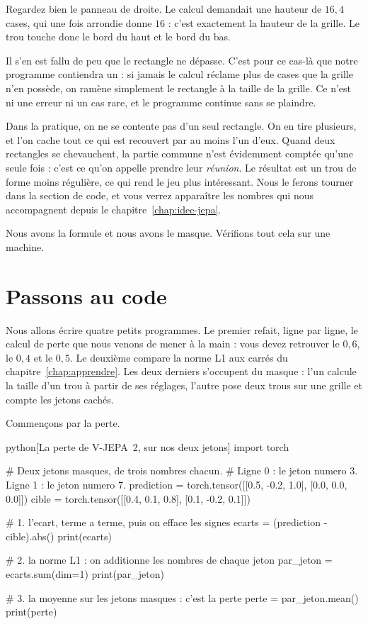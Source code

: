 \begin{surlesdonnees}
Regardez bien le panneau de droite. Le calcul demandait une hauteur de
$16{,}4$ cases, qui une fois arrondie donne $16$ : c'est exactement la
hauteur de la grille. Le trou touche donc le bord du haut et le bord du bas.

Il s'en est fallu de peu que le rectangle ne dépasse. C'est pour ce cas-là
que notre programme contiendra un  : si jamais le calcul
réclame plus de cases que la grille n'en possède, on ramène simplement le
rectangle à la taille de la grille. Ce n'est ni une erreur ni un cas rare,
et le programme continue sans se plaindre.
\end{surlesdonnees}

\begin{remarque}
Dans la pratique, on ne se contente pas d'un seul rectangle. On en tire
plusieurs, et l'on cache tout ce qui est recouvert par au moins l'un d'eux.
Quand deux rectangles se chevauchent, la partie commune n'est évidemment
comptée qu'une seule fois : c'est ce qu'on appelle prendre leur
\emph{réunion}. Le résultat est un trou de forme moins régulière, ce qui
rend le jeu plus intéressant. Nous le ferons tourner dans la section de code,
et vous verrez apparaître les nombres qui nous accompagnent depuis le
chapitre~\ref{chap:idee-jepa}.
\end{remarque}

Nous avons la formule et nous avons le masque. Vérifions tout cela sur une
machine.

\section{Passons au code}

Nous allons écrire quatre petits programmes. Le premier refait, ligne par
ligne, le calcul de perte que nous venons de mener à la main : vous devez
retrouver le $0{,}6$, le $0{,}4$ et le $0{,}5$. Le deuxième compare la norme
L1 aux carrés du chapitre~\ref{chap:apprendre}. Les deux derniers s'occupent
du masque : l'un calcule la taille d'un trou à partir de ses réglages,
l'autre pose deux trous sur une grille et compte les jetons cachés.

Commençons par la perte.

\begin{code}{python}[La perte de V-JEPA~2, sur nos deux jetons]
import torch

# Deux jetons masques, de trois nombres chacun.
# Ligne 0 : le jeton numero 3. Ligne 1 : le jeton numero 7.
prediction = torch.tensor([[0.5, -0.2, 1.0],
                           [0.0,  0.0, 0.0]])
cible      = torch.tensor([[0.4,  0.1, 0.8],
                           [0.1, -0.2, 0.1]])

# 1. l'ecart, terme a terme, puis on efface les signes
ecarts = (prediction - cible).abs()
print(ecarts)

# 2. la norme L1 : on additionne les nombres de chaque jeton
par_jeton = ecarts.sum(dim=1)
print(par_jeton)

# 3. la moyenne sur les jetons masques : c'est la perte
perte = par_jeton.mean()
print(perte)
\end{code}

